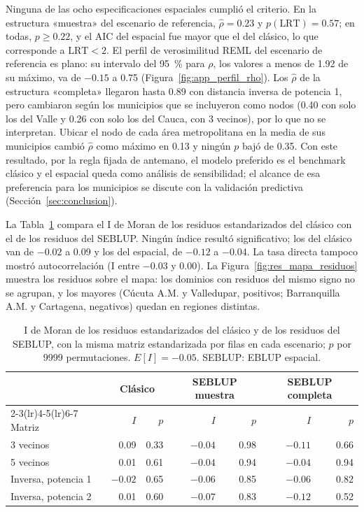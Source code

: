 Ninguna de las ocho especificaciones espaciales cumplió el criterio. En la estructura «muestra» del escenario de referencia, $\hat{\rho} = 0.23$ y $p(\text{LRT}) = 0.57$; en todas, $p \geq 0.22$, y el AIC del espacial fue mayor que el del clásico, lo que corresponde a $\text{LRT} < 2$. El perfil de verosimilitud REML del escenario de referencia es plano: su intervalo del 95~\% para $\rho$, los valores a menos de 1.92 de su máximo, va de $-0.15$ a 0.75 (Figura~\ref{fig:app_perfil_rho}). Los $\hat{\rho}$ de la estructura «completa» llegaron hasta 0.89 con distancia inversa de potencia 1, pero cambiaron según los municipios que se incluyeron como nodos (0.40 con solo los del Valle y 0.26 con solo los del Cauca, con 3 vecinos), por lo que no se interpretan. Ubicar el nodo de cada área metropolitana en la media de sus municipios cambió $\hat{\rho}$ como máximo en 0.13 y ningún $p$ bajó de 0.35. Con este resultado, por la regla fijada de antemano, el modelo preferido es el benchmark clásico y el espacial queda como análisis de sensibilidad; el alcance de esa preferencia para los municipios se discute con la validación predictiva (Sección~\ref{sec:conclusion}).

La Tabla~\ref{tab:res_moran} compara el I de Moran de los residuos estandarizados del clásico con el de los residuos del SEBLUP. Ningún índice resultó significativo; los del clásico van de $-0.02$ a 0.09 y los del espacial, de $-0.12$ a $-0.04$. La tasa directa tampoco mostró autocorrelación (I entre $-0.03$ y 0.00). La Figura~\ref{fig:res_mapa_residuos} muestra los residuos sobre el mapa: los dominios con residuos del mismo signo no se agrupan, y los mayores (Cúcuta A.M. y Valledupar, positivos; Barranquilla A.M. y Cartagena, negativos) quedan en regiones distintas.

\begin{table}[!htbp]
\centering
\small
\caption{I de Moran de los residuos estandarizados del clásico y de los residuos del SEBLUP, con la misma matriz estandarizada por filas en cada escenario; $p$ por \num{9999} permutaciones. $E[I] = -0.05$. SEBLUP: EBLUP espacial.}
\label{tab:res_moran}
\begin{tabular}{l r r r r r r}
\toprule
 & \multicolumn{2}{c}{Clásico} & \multicolumn{2}{c}{SEBLUP muestra} & \multicolumn{2}{c}{SEBLUP completa} \\
\cmidrule(lr){2-3}\cmidrule(lr){4-5}\cmidrule(lr){6-7}
Matriz & $I$ & $p$ & $I$ & $p$ & $I$ & $p$ \\
\midrule
3 vecinos & 0.09 & 0.33 & $-0.04$ & 0.98 & $-0.11$ & 0.66 \\
5 vecinos & 0.01 & 0.61 & $-0.04$ & 0.94 & $-0.04$ & 0.94 \\
Inversa, potencia 1 & $-0.02$ & 0.65 & $-0.06$ & 0.85 & $-0.06$ & 0.82 \\
Inversa, potencia 2 & 0.01 & 0.60 & $-0.07$ & 0.83 & $-0.12$ & 0.52 \\
\bottomrule
\end{tabular}
\end{table}

